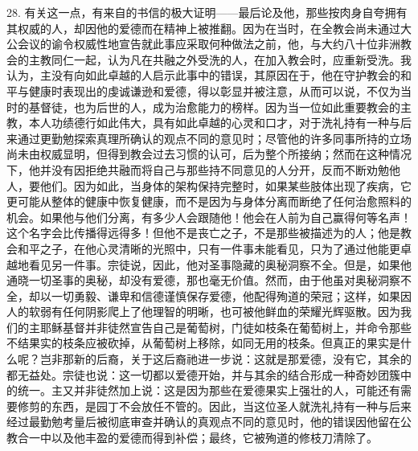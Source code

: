 28. 有关这一点，有来自的书信的极大证明——最后论及他，那些按肉身自夸拥有其权威的人，却因他的爱德而在精神上被推翻。因为在当时，在全教会尚未通过大公会议的谕令权威性地宣告就此事应采取何种做法之前，他，与大约八十位非洲教会的主教同仁一起，认为凡在共融之外受洗的人，在加入教会时，应重新受洗。我认为，主没有向如此卓越的人启示此事中的错误，其原因在于，他在守护教会的和平与健康时表现出的虔诚谦逊和爱德，得以彰显并被注意，从而可以说，不仅为当时的基督徒，也为后世的人，成为治愈能力的榜样。因为当一位如此重要教会的主教，本人功绩德行如此伟大，具有如此卓越的心灵和口才，对于洗礼持有一种与后来通过更勤勉探索真理所确认的观点不同的意见时；尽管他的许多同事所持的立场尚未由权威显明，但得到教会过去习惯的认可，后为整个所接纳；然而在这种情况下，他并没有因拒绝共融而将自己与那些持不同意见的人分开，反而不断劝勉他人，要他们。因为如此，当身体的架构保持完整时，如果某些肢体出现了疾病，它更可能从整体的健康中恢复健康，而不是因为与身体分离而断绝了任何治愈照料的机会。如果他与他们分离，有多少人会跟随他！他会在人前为自己赢得何等名声！这个名字会比传播得远得多！但他不是丧亡之子，不是那些被描述为的人；他是教会和平之子，在他心灵清晰的光照中，只有一件事未能看见，只为了通过他能更卓越地看见另一件事。宗徒说，因此，他对圣事隐藏的奥秘洞察不全。但是，如果他通晓一切圣事的奥秘，却没有爱德，那也毫无价值。然而，由于他虽对奥秘洞察不全，却以一切勇毅、谦卑和信德谨慎保存爱德，他配得殉道的荣冠；这样，如果因人的软弱有任何阴影爬上了他理智的明晰，也可被他鲜血的荣耀光辉驱散。因为我们的主耶稣基督并非徒然宣告自己是葡萄树，门徒如枝条在葡萄树上，并命令那些不结果实的枝条应被砍掉，从葡萄树上移除，如同无用的枝条。但真正的果实是什么呢？岂非那新的后裔，关于这后裔祂进一步说：这就是那爱德，没有它，其余的都无益处。宗徒也说：这一切都以爱德开始，并与其余的结合形成一种奇妙团簇中的统一。主又并非徒然加上说：这是因为那些在爱德果实上强壮的人，可能还有需要修剪的东西，是园丁不会放任不管的。因此，当这位圣人就洗礼持有一种与后来经过最勤勉考量后被彻底审查并确认的真观点不同的意见时，他的错误因他留在公教合一中以及他丰盈的爱德而得到补偿；最终，它被殉道的修枝刀清除了。\par

